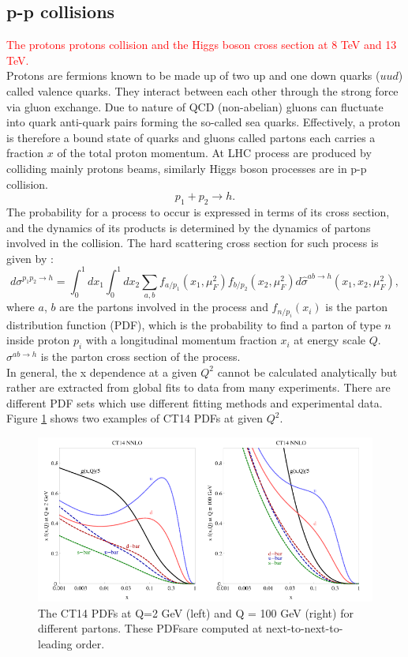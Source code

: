 \subsection{p-p collisions}
\label{chap1:H2012:PP}
\textcolor{red}{The protons protons collision and the Higgs boson cross section at 8 TeV and 13 TeV. \\}
Protons are fermions known to be made up of two up and one down quarks ($uud$) called valence quarks. They interact between each other through the strong force via gluon exchange. Due to nature of QCD (non-abelian) gluons can fluctuate into quark anti-quark pairs forming the so-called sea quarks. Effectively, a proton is therefore a bound state of quarks and gluons called partons each carries a fraction $x$ of the total proton momentum. At LHC process are produced by colliding mainly protons beams, similarly Higgs boson processes are in p-p collision.
\begin{equation}
    p_1 + p_2 \rightarrow h.
\end{equation}
The probability for a process to occur is expressed in terms of its cross section, and the dynamics of its products is determined by the dynamics of partons involved in the collision. The hard scattering cross section for such process is given by :
\begin{equation}
    d \sigma^{p_{1} p_{2} \rightarrow h}=\int_{0}^{1} d x_{1} \int_{0}^{1} d x_{2} \sum_{a, b} f_{a / p_{1}}\left(x_{1}, \mu_{F}^{2}\right) f_{b / p_{2}}\left(x_{2}, \mu_{F}^{2}\right) d \hat{\sigma}^{a b \rightarrow h}\left(x_1, x_2, \mu_{F}^{2}\right), 
\end{equation}
where $a$, $b$ are the partons involved in the process and $f_{n/p_i}(x_i)$ is the parton distribution function (PDF), which is the probability to find a parton of type $n$ inside proton $p_i$ with a longitudinal momentum fraction $x_i$ at energy scale $Q$. $\sigma^{a b \rightarrow h}$ is the parton cross section of the process. \\
In general, the x dependence at a given $Q^2$ cannot be calculated analytically but rather are extracted from global fits to data from many experiments. There are different PDF sets which use different fitting methods and experimental data. Figure \ref{fig:chap1:H2012:PDF} shows two examples of CT14 PDFs at given $Q^2$. 
\begin{figure}[ht]
    \centering
    \includegraphics[width=\textwidth]{Ch1/Img/PDFs.png}
    \caption{The CT14 PDFs at Q=2 GeV (left) and Q = 100 GeV (right) for different partons. These PDFsare computed at next-to-next-to-leading order.}
    \label{fig:chap1:H2012:PDF}
\end{figure}
